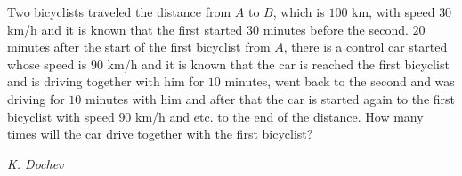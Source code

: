 Two bicyclists traveled the distance from $A$ to $B$, which is $100$ km, with speed $30$ km/h and it is known that the first started $30$ minutes before the second. $20$ minutes after the start of the first bicyclist from $A$, there is a control car started whose speed is $90$ km/h and it is known that the car is reached the first bicyclist and is driving together with him for $10$ minutes, went back to the second and was driving for $10$ minutes with him and after that the car is started again to the first bicyclist with speed $90$ km/h and etc. to the end of the distance. How many times will the car drive together with the first bicyclist?

\textit{K. Dochev}